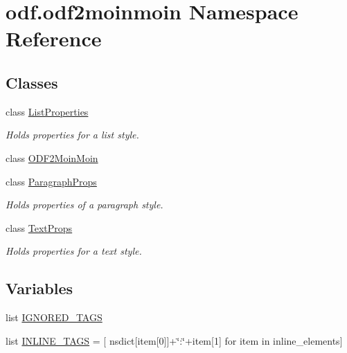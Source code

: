 \hypertarget{namespaceodf_1_1odf2moinmoin}{\section{odf.\+odf2moinmoin Namespace Reference}
\label{namespaceodf_1_1odf2moinmoin}
}
\subsection*{Classes}
\begin{DoxyCompactItemize}
\item 
class \hyperlink{classodf_1_1odf2moinmoin_1_1ListProperties}{List\+Properties}
\begin{DoxyCompactList}\small\item\em Holds properties for a list style. \end{DoxyCompactList}\item 
class \hyperlink{classodf_1_1odf2moinmoin_1_1ODF2MoinMoin}{O\+D\+F2\+Moin\+Moin}
\item 
class \hyperlink{classodf_1_1odf2moinmoin_1_1ParagraphProps}{Paragraph\+Props}
\begin{DoxyCompactList}\small\item\em Holds properties of a paragraph style. \end{DoxyCompactList}\item 
class \hyperlink{classodf_1_1odf2moinmoin_1_1TextProps}{Text\+Props}
\begin{DoxyCompactList}\small\item\em Holds properties for a text style. \end{DoxyCompactList}\end{DoxyCompactItemize}
\subsection*{Variables}
\begin{DoxyCompactItemize}
\item 
list \hyperlink{namespaceodf_1_1odf2moinmoin_ae790cd24a0f06d818d0244c39006f0c4}{I\+G\+N\+O\+R\+E\+D\+\_\+\+T\+A\+G\+S}
\item 
list \hyperlink{namespaceodf_1_1odf2moinmoin_a0289a4d7cb05f857a7b043eacdbc4fcf}{I\+N\+L\+I\+N\+E\+\_\+\+T\+A\+G\+S} = \mbox{[} nsdict\mbox{[}item\mbox{[}0\mbox{]}\mbox{]}+\char`\"{}\+:\char`\"{}+item\mbox{[}1\mbox{]} for item in inline\+\_\+elements\mbox{]}
\end{DoxyCompactItemize}


